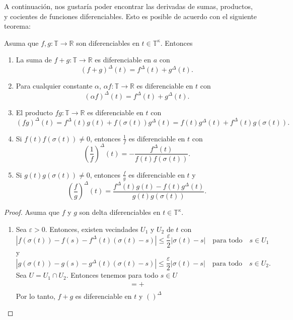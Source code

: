 A continuación, nos gustaría poder encontrar las derivadas de sumas, productos, y cocientes de funciones diferenciables. Esto es posible de acuerdo con el siguiente teorema:
\begin{theorem}{}
	Asuma que $f,g\colon\mathds{T}\rightarrow\mathds{R}$ son diferenciables en $t\in\mathds{T}^{\kappa}$. Entonces
	\begin{enumerate}
		\item La suma de $f+g\colon\mathds{T}\rightarrow\mathds{R}$ es diferenciable en $a$ con \[ {\left(f+g\right)}^{\Delta}(t)=f^{\Delta}(t)+g^{\Delta}(t). \]
		\item Para cualquier constante $\alpha$, $\alpha f\colon\mathds{T}\rightarrow\mathds{R}$ es diferenciable en $t$ con \[ {\left(\alpha f\right)}^{\Delta}\left(t\right)=f^{\Delta}\left(t\right)+g^{\Delta}\left(t\right). \]
		\item El producto $fg\colon\mathds{T}\rightarrow\mathds{R}$ es diferenciable en $t$ con \[ {\left(fg\right)}^{\Delta}\left(t\right)=f^{\Delta}\left(t\right)g\left(t\right)+f\left(\sigma\left(t\right)\right)g^{\Delta}\left(t\right)=f\left(t\right)g^{\Delta}\left(t\right)+f^{\Delta}\left(t\right)g\left(\sigma\left(t\right)\right). \]
		\item Si $f\left(t\right)f\left(\sigma\left(t\right)\right)\neq0$, entonces $\frac{1}{f}$ es diferenciable en $t$ con \[ {\left(\frac{1}{f}\right)}^{\Delta}\left(t\right)=-\frac{f^{\Delta}\left(t\right)}{f\left(t\right)f\left(\sigma\left(t\right)\right)}. \]
		\item Si $g\left(t\right)g\left(\sigma\left(t\right)\right)\neq0$, entonces $\frac{f}{g}$ es diferenciable en $t$ y \[ {\left(\frac{f}{g}\right)}^{\Delta}\left(t\right)=\frac{f^{\Delta}\left(t\right)g\left(t\right)-f\left(t\right)g^{\Delta}\left(t\right)}{g\left(t\right)g\left(\sigma\left(t\right)\right)}. \]
	\end{enumerate}
\end{theorem}
\begin{proof}
	Asuma que $f$ y $g$ son delta diferenciables en $t\in\mathds{T}^{\kappa}$.
	\begin{enumerate}
		\item Sea $\varepsilon>0$. Entonces, existen vecindades $U_{1}$ y $U_{2}$ de $t$ con \[ \left|f\left(\sigma\left(t\right)\right)-f\left(s\right)-f^{\Delta}\left(t\right)\left(\sigma\left(t\right)-s\right)\right|\leq\frac{\varepsilon}{2}\left|\sigma\left(t\right)-s\right|\quad\text{para todo}\quad s\in U_{1} \] y \[ \left|g\left(\sigma\left(t\right)\right)-g\left(s\right)-g^{\Delta}\left(t\right)\left(\sigma\left(t\right)-s\right)\right|\leq\frac{\varepsilon}{2}\left|\sigma\left(t\right)-s\right|\quad\text{para todo}\quad s\in U_{2}. \] Sea $U=U_{1}\cap U_{2}$. Entonces tenemos para todo $s\in U$
		\begin{align*}
		=+\\
		\end{align*}
		Por lo tanto, $f+g$ es diferenciable en $t$ y ${\left(\right)}^{\Delta}$
	\end{enumerate}
\end{proof}

